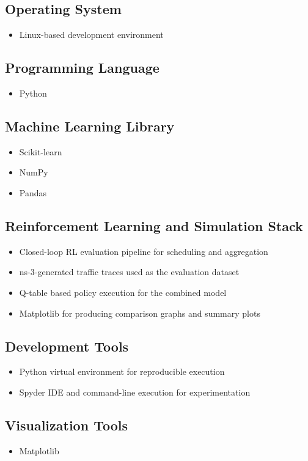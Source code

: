 \subsection{Operating System}
\begin{itemize}
\item Linux-based development environment
\end{itemize}
\subsection{Programming Language}
\begin{itemize}
\item Python  
\end{itemize}
\subsection{Machine Learning Library}
\begin{itemize}
\item Scikit-learn  
\item NumPy  
\item Pandas  
\end{itemize}
\subsection{Reinforcement Learning and Simulation Stack}
\begin{itemize}
\item Closed-loop RL evaluation pipeline for scheduling and aggregation
\item ns-3-generated traffic traces used as the evaluation dataset
\item Q-table based policy execution for the combined model
\item Matplotlib for producing comparison graphs and summary plots
\end{itemize}
\subsection{Development Tools}
\begin{itemize}
\item Python virtual environment for reproducible execution  
\item Spyder IDE and command-line execution for experimentation  
\end{itemize}
\subsection{Visualization Tools}
\begin{itemize}
\item Matplotlib
\end{itemize}